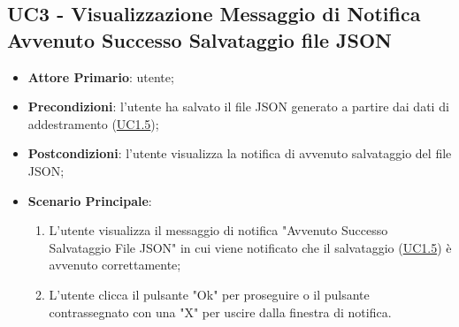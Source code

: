 	\subsection{UC3 - Visualizzazione Messaggio di Notifica Avvenuto Successo Salvataggio file JSON}
		\begin{itemize}
			\item\textbf{Attore Primario}: utente;
			\item\textbf{Precondizioni}: l'utente ha salvato il file JSON generato a partire dai dati di addestramento (\hyperref[par:UC1.5]{UC1.5}); 
			\item\textbf{Postcondizioni}: l'utente visualizza la notifica di avvenuto salvataggio del file JSON;					\item\textbf{Scenario Principale}: 
				\begin{enumerate} 
					\item L’utente visualizza il messaggio di notifica "Avvenuto Successo Salvataggio File JSON" in cui viene notificato che il salvataggio (\hyperref[par:UC1.5]{UC1.5}) è avvenuto correttamente;
					\item L'utente clicca il pulsante "Ok" per proseguire o il pulsante contrassegnato con una "X" per uscire dalla finestra di notifica.		
				\end{enumerate}		
		\end{itemize}



	\label{par:UC4}
